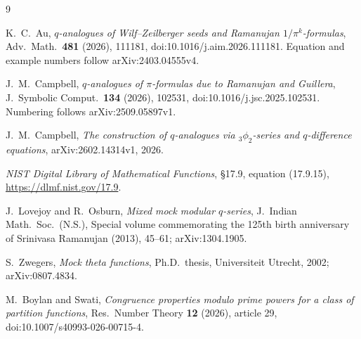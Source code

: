 \begin{thebibliography}{9}

K.~C.~Au, \emph{$q$-analogues of Wilf--Zeilberger seeds and Ramanujan
$1/\pi^k$-formulas}, Adv.\ Math.\ \textbf{481} (2026), 111181,
doi:10.1016/j.aim.2026.111181. Equation and example numbers follow
arXiv:2403.04555v4.

J.~M.~Campbell, \emph{$q$-analogues of $\pi$-formulas due to Ramanujan and
Guillera}, J.\ Symbolic Comput.\ \textbf{134} (2026), 102531,
doi:10.1016/j.jsc.2025.102531. Numbering follows arXiv:2509.05897v1.

J.~M.~Campbell, \emph{The construction of $q$-analogues via ${}_3\phi_2$-series
and $q$-difference equations}, arXiv:2602.14314v1, 2026.

\emph{NIST Digital Library of Mathematical Functions}, \S17.9, equation
(17.9.15), \url{https://dlmf.nist.gov/17.9}.

J.~Lovejoy and R.~Osburn, \emph{Mixed mock modular $q$-series}, J.\ Indian
Math.\ Soc.\ (N.S.), Special volume commemorating the 125th birth anniversary
of Srinivasa Ramanujan (2013), 45--61; arXiv:1304.1905.

S.~Zwegers, \emph{Mock theta functions}, Ph.D.\ thesis, Universiteit Utrecht,
2002; arXiv:0807.4834.

M.~Boylan and Swati, \emph{Congruence properties modulo prime powers for a
class of partition functions}, Res.\ Number Theory \textbf{12} (2026), article
29, doi:10.1007/s40993-026-00715-4.

\end{thebibliography}
